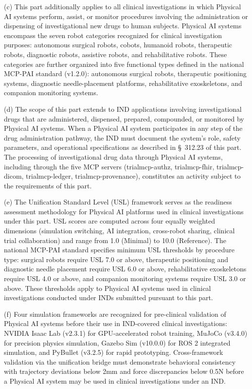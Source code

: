 \documentclass[11pt]{article}
\begin{document}
(c) This part additionally applies to all clinical investigations in which Physical AI systems perform, assist, or monitor procedures involving the administration or dispensing of investigational new drugs to human subjects. Physical AI systems encompass the seven robot categories recognized for clinical investigation purposes: autonomous surgical robots, cobots, humanoid robots, therapeutic robots, diagnostic robots, assistive robots, and rehabilitative robots. These categories are further organized into five functional types defined in the national MCP-PAI standard (v1.2.0): autonomous surgical robots, therapeutic positioning systems, diagnostic needle-placement platforms, rehabilitative exoskeletons, and companion monitoring systems.

(d) The scope of this part extends to IND applications involving investigational drugs that are administered, dispensed, prepared, compounded, or monitored by Physical AI systems. When a Physical AI system participates in any step of the drug administration pathway, the IND must document the system's role, safety parameters, and operational specifications as described in \S~312.23 of this part. The processing of investigational drug data through Physical AI systems, including through the five MCP servers (trialmcp-authz, trialmcp-fhir, trialmcp-dicom, trialmcp-ledger, trialmcp-provenance), constitutes an activity subject to the requirements of this part.

(e) The Unification Standard Level (USL) framework serves as the readiness assessment methodology for Physical AI platforms used in clinical investigations under this part. USL scores are computed across four equally weighted dimensions (simulation switching, AI integration, cross-robot sharing, clinical trial collaboration) and range from 1.0 (Minimal) to 10.0 (Reference). The national MCP-PAI standard specifies minimum USL thresholds by procedure type: surgical robots require USL 7.0 or above, therapeutic positioning and diagnostic needle placement require USL 6.0 or above, rehabilitative exoskeletons require USL 4.0 or above, and companion monitoring systems require USL 3.0 or above. These thresholds apply to Physical AI systems used in clinical investigations conducted under INDs submitted pursuant to this part.

(f) Four simulation frameworks are recognized for pre-clinical validation of Physical AI systems before their use in IND-covered clinical investigations: NVIDIA Isaac Lab (v2.3.1) for GPU-accelerated robot training, MuJoCo (v3.4.0) for precision physics simulation, Gazebo Sim (v10.0.0) for ROS 2 integrated simulation, and PyBullet (v3.2.5) for rapid prototyping. Cross-framework validation via the unification bridge must demonstrate behavioral consistency with trajectory deviations below 2mm and force discrepancies below 0.5N before a Physical AI system may be used in clinical investigations under an IND.
\end{document}
